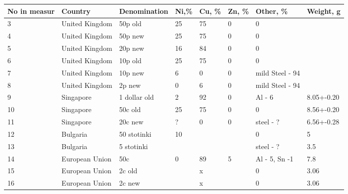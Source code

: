 \documentclass[11pt,a4paper,twoside,onecolumn]{article}
\begin{document}
\begin{table}[htbp]
    \centering
    \begin{tabular}{@{}llllllll@{}}
    \toprule
    No in   measur & Country        & Denomination   & Ni,\%    & Cu, \%   & Zn, \% & Other, \%            & Weight, g  \\ \midrule
    3              & United Kingdom & 50p old        & 25       & 75       & 0      & 0                    &            \\
    4              & United Kingdom & 50p new        & 25       & 75       & 0      & 0                    &            \\
    5              & United Kingdom & 20p new        & 16       & 84       & 0      & 0                    &            \\
    6              & United Kingdom & 10p old        & 25       & 75       & 0      & 0                    &            \\
    7              & United Kingdom & 10p new        & 6        & 0        & 0      & mild Steel - 94      &            \\
    8              & United Kingdom & 2p new         & 0        & 6        & 0      & mild Steel - 94      &            \\
    9              & Singapore      & 1 dollar old   & 2        & 92       & 0      & Al - 6               & 8.05+-0.20 \\
    10             & Singapore      & 50c old        & 25       & 75       & 0      & 0                    & 8.56+-0.20 \\
    11             & Singapore      & 20c new        & ?        & 0        & 0      & steel - ?            & 6.56+-0.28 \\
    12             & Bulgaria       & 50 stotinki    & 10       &          &        & 0                    & 5          \\
    13             & Bulgaria       & 5 stotinki     &          &          &        & steel - ?            & 3.5        \\
    14             & European Union & 50c            & 0        & 89       & 5      & Al - 5, Sn -1        & 7.8        \\
    15             & European Union & 2c old         &          & x        &        & 0                    & 3.06       \\
    16             & European Union & 2c new         &          & x        &        & 0                    & 3.06       \\

\end{tabular}
\end{table}
\end{document}
